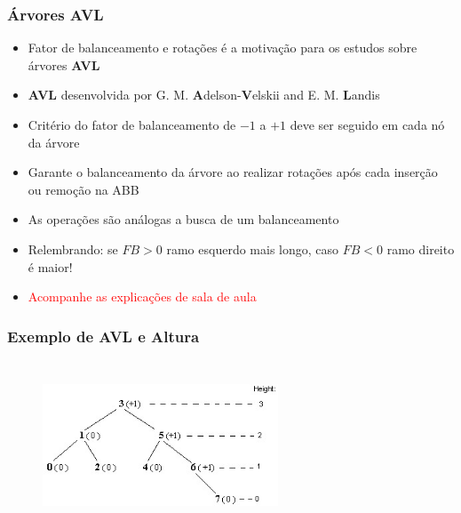 \begin{frame}
    \frametitle{Árvores AVL}
    
    \begin{itemize}
    
    \item Fator de balanceamento e rotações é a motivação para os estudos sobre árvores   \textbf{AVL}

    \item \textbf{AVL} desenvolvida por G. M. \textbf{A}delson-\textbf{V}elskii and E. M. \textbf{L}andis
    
    \item Critério do fator de balanceamento de $-1$ a $+1$ deve ser seguido em cada
    nó da árvore
    
    \item Garante o balanceamento da árvore ao realizar rotações após cada inserção ou remoção na ABB
    
    \item As operações são análogas a busca de um balanceamento 
    
    \item Relembrando: se $FB > 0$ ramo esquerdo mais longo, caso $FB < 0$ ramo direito é maior!
    \pause
    \item \textcolor{red}{Acompanhe as explicações de sala de aula}
    \end{itemize}
\end{frame}


\begin{frame}[fragile]
  \frametitle{Exemplo de AVL e Altura}
  
   \begin{figure}[tbp]
    \includegraphics[width=7cm, height=5cm]{figs/fig_arvores/AVL-tree-example.jpg}
    \centering
    \end{figure}

 \end{frame}

